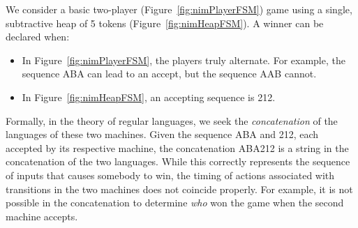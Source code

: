 \documentclass[sigplan,anonymous,review]{acmart}
\begin{document}
We consider a basic two-player (Figure~\ref{fig:nimPlayerFSM}) game using a single, subtractive heap of 5 tokens (Figure~\ref{fig:nimHeapFSM}).
A winner can be declared when:
\begin{itemize}
    \item In Figure~\ref{fig:nimPlayerFSM}, the players truly alternate.  For example, the sequence ABA can lead to an accept, but the sequence AAB cannot.
    \item In Figure~\ref{fig:nimHeapFSM}, an accepting sequence is 212.
\end{itemize}
Formally, in the theory of regular languages, we seek the \emph{concatenation} of the languages of these two machines.   Given the sequence ABA and 212, each accepted by its respective machine, the concatenation ABA212 is a string in the concatenation of the two languages.  While this correctly represents the sequence of inputs that causes somebody to win, the timing of actions associated with transitions in the two machines does not coincide properly.  For example, it is not possible in the concatenation to determine \emph{who} won the game when the second machine accepts. 
\end{document}
